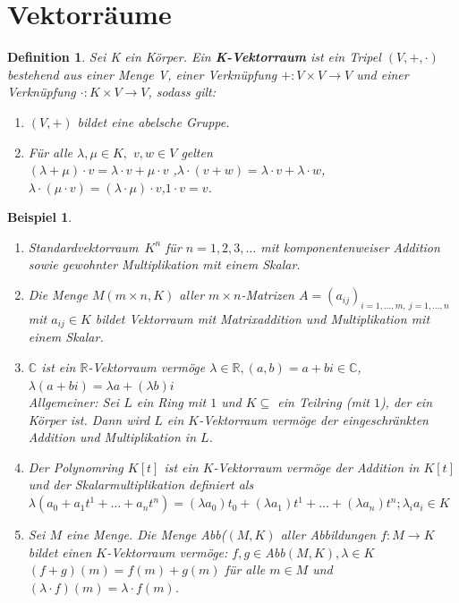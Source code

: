 \documentclass[12pt,a4paper]{article}
\theoremstyle{plain}
\newtheorem{Definition}[Theorem]{Definition}
\newtheorem{Beispiel}[Theorem]{Beispiel}
\newcommand{\herv}[1]{{\emph{\textbf{#1}}}}
\newcommand{\R}{\mathbb{R}}
\newcommand{\C}{\mathbb{C}}
\numberwithin{equation}{section}
\begin{document}
\section{Vektorräume}
\begin{Definition}
Sei K ein Körper. Ein \herv{K-Vektorraum} ist ein Tripel $(V,+,\cdot)$ bestehend aus einer Menge V, einer Verknüpfung $+:V\times V \rightarrow V$ und einer Verknüpfung $\cdot : K\times V \rightarrow V$, sodass gilt:
\begin{enumerate}
\renewcommand{\labelenumi}{\emph{(V\arabic{enumi})}}
\item $(V,+)$ bildet eine abelsche Gruppe.
\item Für alle $\lambda, \mu \in K,$  $ v,w\in V$ gelten \\
$(\lambda+\mu)\cdot v=\lambda \cdot v+ \mu\cdot v$ ,\quad $\lambda\cdot (v+w)=\lambda\cdot v+ \lambda \cdot w$,\quad $\lambda\cdot (\mu\cdot v)=(\lambda\cdot\mu)\cdot v$,\quad $1\cdot v=v$.
\end{enumerate}
\end{Definition}
\begin{Beispiel}
\begin{enumerate}
\renewcommand{\labelenumi}{\alph{enumi})}
\item \glqq Standardvektorraum\grqq\ $K^n$ für $n=1,2,3,\ldots$ mit komponentenweiser Addition sowie gewohnter Multiplikation mit einem Skalar.
\item Die Menge $M(m\times n,K)$ aller $m\times n$-Matrizen $A=(a_{ij})_{i=1,\ldots,m,\ j=1,\ldots,n}$ mit $a_{ij}\in K$ bildet Vektorraum mit Matrixaddition und Multiplikation mit einem Skalar.
\item $\C$ ist ein $\R$-Vektorraum vermöge $\lambda\in\R, (a,b)=a+bi\in\C$, $\lambda(a+bi)=\lambda a+(\lambda b) i$\\
Allgemeiner: Sei $L$ ein Ring mit $1$ und $K\subseteq$ ein Teilring (mit $1$), der ein Körper ist. Dann wird $L$ ein $K$-Vektorraum vermöge der eingeschränkten Addition und Multiplikation in $L$.
\item Der Polynomring $K[t]$ ist ein $K$-Vektorraum vermöge der Addition in $K[t]$ und der Skalarmultiplikation definiert als $\lambda(a_0+a_1t^1+\ldots+a_nt^n)=(\lambda a_0)t_0+(\lambda a_1)t^1+\ldots+(\lambda a_n)t^n; \lambda_ia_i \in K$
\item  Sei $M$ eine Menge. Die Menge Abb($(M,K)$ aller Abbildungen $f:M\rightarrow K$ bildet einen $K$-Vektorraum vermöge: $f,g\in$Abb$(M,K),\lambda\in K$ $(f+g)(m)=f(m)+g(m)$ für alle $m\in M$ und $(\lambda\cdot f)(m)=\lambda\cdot f(m)$.
\end{enumerate}
\end{Beispiel}
\end{document}
